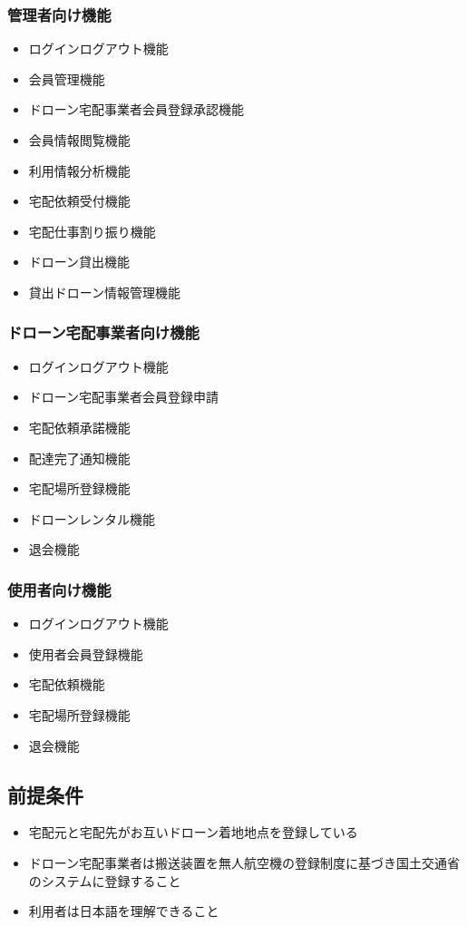 \documentclass[a4paper, titlepage]{jsarticle}
\begin{document}
\subsubsection{管理者向け機能}
\begin{itemize}
        \item ログインログアウト機能
        \item 会員管理機能
        \item ドローン宅配事業者会員登録承認機能
        \item 会員情報閲覧機能
        \item 利用情報分析機能
        \item 宅配依頼受付機能
        \item 宅配仕事割り振り機能
        \item ドローン貸出機能
        \item 貸出ドローン情報管理機能
\end{itemize}
\subsubsection{ドローン宅配事業者向け機能}
\begin{itemize}
        \item ログインログアウト機能
        \item ドローン宅配事業者会員登録申請
        \item 宅配依頼承諾機能
        \item 配達完了通知機能
        \item 宅配場所登録機能
        \item ドローンレンタル機能
        \item 退会機能
\end{itemize}
\subsubsection{使用者向け機能}
\begin{itemize}
        \item ログインログアウト機能
        \item 使用者会員登録機能
        \item 宅配依頼機能
        \item 宅配場所登録機能
        \item 退会機能
\end{itemize}
\subsection{前提条件}
\begin{itemize}
        \item 宅配元と宅配先がお互いドローン着地地点を登録している
        \item ドローン宅配事業者は搬送装置を無人航空機の登録制度に基づき国土交通省のシステムに登録すること
        \item 利用者は日本語を理解できること
\end{itemize}
\end{document}
